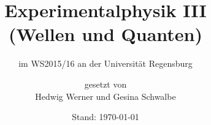 \usepackage[utf8]{inputenc}
\usepackage[T1]{fontenc}
\usepackage{babel}
\usepackage{csquotes}
\usepackage{lmodern}
\usepackage{microtype}
\usepackage{makeidx}
\makeindex
%
% 
\usepackage[intoc]{nomencl}
\makenomenclature
\usepackage[backend=biber]{biblatex}


\usepackage{color}

\usepackage{amsmath}
\usepackage{mathtools}
\usepackage{amssymb}
\usepackage{dsfont}
\usepackage{amsthm}
\usepackage[
output-decimal-marker={,},
exponent-product=\cdot,
per-mode=fraction]
{siunitx}
\usepackage{booktabs}
\usepackage{enumerate}

\usepackage[%
pdftitle={Experimentalphysik III (Wellen und Quanten)},
pdfauthor={Hedwig Werner}]%
{hyperref}
\usepackage{tabularx}
\usepackage{graphicx}
\usepackage{wrapfig}
\usepackage{gensymb}

\setcounter{tocdepth}{4}

\setcounter{secnumdepth}{4}
\renewcommand{\theparagraph}{\alph{paragraph})} 

\subject{Vorlesungsmitschrift}
\title{Experimentalphysik III\\ (Wellen und Quanten)}
\subtitle{im WS2015/16 an der Universität Regensburg}
\date{Stand: \today}
\author{{\Large gesetzt von}\\ Hedwig Werner und Gesina Schwalbe}


